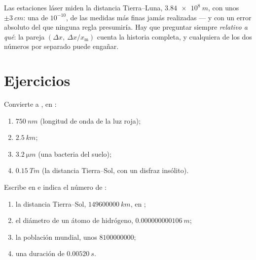 \begin{remark}\label{rem:g10:orders-of-magnitude:precision}
Las estaciones láser miden la distancia Tierra--Luna,
$\qty{3.84e8}{m}$, con unos $\pm\qty{3}{cm}$: una 
de $10^{-10}$, de las medidas más finas jamás realizadas --- y con un
error absoluto del que ninguna regla presumiría. Hay que preguntar
siempre \emph{relativo a qué}: la pareja
$(\Delta x,\ \Delta x / x_{\text{m}})$ cuenta la historia completa, y
cualquiera de los dos números por separado puede engañar.
\end{remark}

\section{Ejercicios}

\begin{exercise}[$\star$]\label{exo:g10:orders-of-magnitude:1}
Convierte a , en :
\begin{enumerate}
  \item $\qty{750}{nm}$ (longitud de onda de la luz roja);
  \item $\qty{2.5}{km}$;
  \item $\qty{3.2}{\micro m}$ (una bacteria del suelo);
  \item $\qty{0.15}{Tm}$ (la distancia Tierra--Sol, con un disfraz
        insólito).
\end{enumerate}
\end{exercise}

\begin{exercise}[$\star$]\label{exo:g10:orders-of-magnitude:2}
Escribe en  e indica el número de :
\begin{enumerate}
  \item la distancia Tierra--Sol, $\qty{149600000}{km}$, en ;
  \item el diámetro de un átomo de hidrógeno, $\qty{0.000000000106}{m}$;
  \item la población mundial, unos $\num{8100000000}$;
  \item una duración de $\qty{0.00520}{s}$.
\end{enumerate}
\end{exercise}

